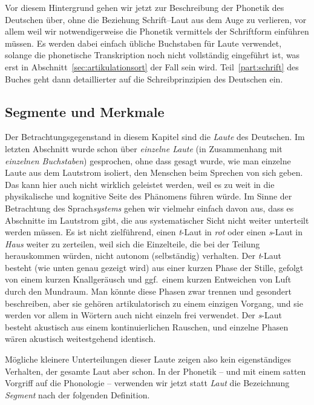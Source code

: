 Vor diesem Hintergrund gehen wir jetzt zur Beschreibung der Phonetik des Deutschen über, ohne die Beziehung Schrift--Laut aus dem Auge zu verlieren, vor allem weil wir notwendigerweise die Phonetik vermittels der Schriftform einführen müssen.
Es werden dabei einfach übliche Buchstaben für Laute verwendet, solange die phonetische Transkription noch nicht vollständig eingeführt ist, was erst in Abschnitt~\ref{sec:artikulationsort} der Fall sein wird.
Teil~\ref{part:schrift} des Buches geht dann detaillierter auf die Schreibprinzipien des Deutschen ein.

\subsection{Segmente und Merkmale}

\label{sec:segmentemerkmale}

Der Betrachtungsgegenstand in diesem Kapitel sind die \textit{Laute} des Deutschen.
Im letzten Abschnitt wurde schon über \textit{einzelne Laute} (in Zusammenhang mit \textit{einzelnen Buchstaben}) gesprochen, ohne dass gesagt wurde, wie man einzelne Laute aus dem Lautstrom isoliert, den Menschen beim Sprechen von sich geben.
Das kann hier auch nicht wirklich geleistet werden, weil es zu weit in die physikalische und kognitive Seite des Phänomens führen würde.
Im Sinne der Betrachtung des Sprach\textit{systems} gehen wir vielmehr einfach davon aus, dass es Abschnitte im Lautstrom gibt, die aus systematischer Sicht nicht weiter unterteilt werden müssen.
Es ist \zB nicht zielführend, einen \textit{t}-Laut in \textit{rot} oder einen \textit{s}-Laut in \textit{Haus} weiter zu zerteilen, weil sich die Einzelteile, die bei der Teilung herauskommen würden, nicht autonom (selbständig) verhalten.
Der \textit{t}-Laut besteht (wie unten genau gezeigt wird) aus einer kurzen Phase der Stille, gefolgt von einem kurzen Knallgeräusch und ggf.\ einem kurzen Entweichen von Luft durch den Mundraum.
Man könnte diese Phasen zwar trennen und gesondert beschreiben, aber sie gehören artikulatorisch zu einem einzigen Vorgang, und sie werden vor allem in Wörtern auch nicht einzeln frei verwendet.
Der \textit{s}-Laut besteht akustisch aus einem kontinuierlichen Rauschen, und einzelne Phasen wären akustisch weitestgehend identisch.

Mögliche kleinere Unterteilungen dieser Laute zeigen also kein eigenständiges Verhalten, der gesamte Laut aber schon.
In der Phonetik -- und mit einem satten Vorgriff auf die Phonologie -- verwenden wir jetzt statt \textit{Laut} die Bezeichnung \textit{Segment} nach der folgenden Definition.

